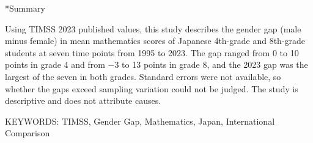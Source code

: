 \documentclass[a4paper,10pt,twocolumn]{ltjsarticle}
\makeatletter
\renewcommand{\section}{\@startsection{section}{1}{\z@}{1.1\Cvs \@plus.4\Cdp \@minus.2\Cdp}{.5\Cvs \@plus.2\Cdp}{\normalfont\gtfamily\bfseries\large}}
\makeatother
\begin{document}
\section*{Summary}
{\footnotesize\setlength{\parindent}{0pt}Using TIMSS 2023 published values, this study describes the gender gap (male minus female) in mean mathematics scores of Japanese 4th-grade and 8th-grade students at seven time points from 1995 to 2023. The gap ranged from 0 to 10 points in grade 4 and from −3 to 13 points in grade 8, and the 2023 gap was the largest of the seven in both grades. Standard errors were not available, so whether the gaps exceed sampling variation could not be judged. The study is descriptive and does not attribute causes.\par\smallskip KEYWORDS: TIMSS, Gender Gap, Mathematics, Japan, International Comparison\par}
\medskip\noindent{}
\end{document}
